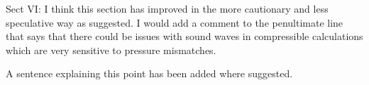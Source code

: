 \documentclass[aps, 11pt, singlecolumn]{revtex4-1} %
\begin{document}
\begin{singlespace}
\begin{myquotation}
Sect VI:  I think this section has improved in the more cautionary and less
speculative way as suggested.  I would add a comment to the penultimate line
that says that there could be issues with sound waves in compressible
calculations which are very sensitive to pressure mismatches.
\end{myquotation}
A sentence explaining this point has been added where suggested.

\end{singlespace}





\end{document}
